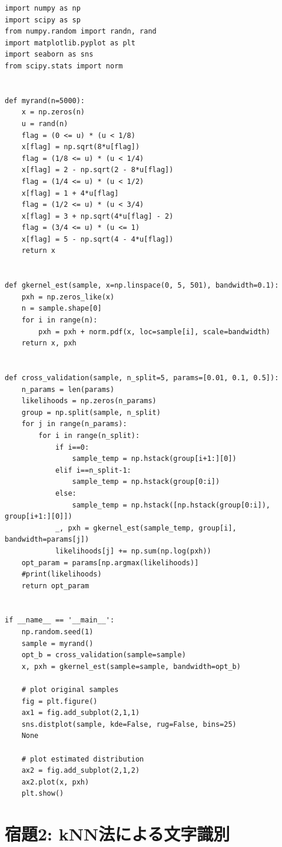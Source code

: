\documentclass[11pt,a4paper,dvipdfmx]{article}
\theoremstyle{plain}
\newcommand{\1}{\mbox{1}\hspace{-0.25em}\mbox{l}}
\begin{document}
\begin{lstlisting}
import numpy as np
import scipy as sp
from numpy.random import randn, rand
import matplotlib.pyplot as plt
import seaborn as sns
from scipy.stats import norm


def myrand(n=5000):
    x = np.zeros(n)
    u = rand(n)
    flag = (0 <= u) * (u < 1/8)
    x[flag] = np.sqrt(8*u[flag])
    flag = (1/8 <= u) * (u < 1/4)
    x[flag] = 2 - np.sqrt(2 - 8*u[flag])
    flag = (1/4 <= u) * (u < 1/2)
    x[flag] = 1 + 4*u[flag]
    flag = (1/2 <= u) * (u < 3/4)
    x[flag] = 3 + np.sqrt(4*u[flag] - 2)
    flag = (3/4 <= u) * (u <= 1)
    x[flag] = 5 - np.sqrt(4 - 4*u[flag])
    return x


def gkernel_est(sample, x=np.linspace(0, 5, 501), bandwidth=0.1):
    pxh = np.zeros_like(x)
    n = sample.shape[0]
    for i in range(n):
        pxh = pxh + norm.pdf(x, loc=sample[i], scale=bandwidth)
    return x, pxh


def cross_validation(sample, n_split=5, params=[0.01, 0.1, 0.5]):
    n_params = len(params)
    likelihoods = np.zeros(n_params)
    group = np.split(sample, n_split)
    for j in range(n_params):
        for i in range(n_split):
            if i==0:
                sample_temp = np.hstack(group[i+1:][0])
            elif i==n_split-1:
                sample_temp = np.hstack(group[0:i])
            else:
                sample_temp = np.hstack([np.hstack(group[0:i]), group[i+1:][0]])
            _, pxh = gkernel_est(sample_temp, group[i], bandwidth=params[j])
            likelihoods[j] += np.sum(np.log(pxh))
    opt_param = params[np.argmax(likelihoods)]
    #print(likelihoods)
    return opt_param


if __name__ == '__main__':
    np.random.seed(1)
    sample = myrand()
    opt_b = cross_validation(sample=sample)
    x, pxh = gkernel_est(sample=sample, bandwidth=opt_b)

    # plot original samples
    fig = plt.figure()
    ax1 = fig.add_subplot(2,1,1)
    sns.distplot(sample, kde=False, rug=False, bins=25)
    None

    # plot estimated distribution
    ax2 = fig.add_subplot(2,1,2)
    ax2.plot(x, pxh)
    plt.show()

\end{lstlisting}


\newpage
\section*{宿題2: kNN法による文字識別}
\end{document}
